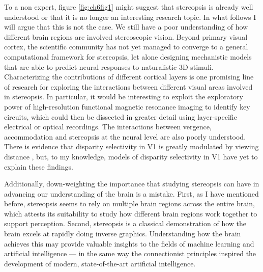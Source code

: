 To a non expert, figure \ref{fig:ch6fig1} might suggest that stereopsis is already well understood or that it is no longer an interesting research topic. In what follows I will argue that this is not the case. We still have a poor understanding of how different brain regions are involved stereoscopic vision. Beyond primary visual cortex, the scientific community has not yet managed to converge to a general computational framework for stereopsis, let alone designing mechanistic models that are able to predict neural responses to naturalistic 3D stimuli. Characterizing the contributions of different cortical layers is one promising line of research for exploring the interactions between different visual areas involved in stereopsis. In particular, it would be interesting to exploit the exploratory power of high-resolution functional magnetic resonance imaging to identify key circuits, which could then be dissected in greater detail using layer-specific electrical or optical recordings. The interactions between vergence, accommodation and stereopsis at the neural level are also poorly understood. There is evidence that disparity selectivity in V1 is greatly modulated by viewing distance \cite{Trotter:1992ij}, but, to my knowledge, models of disparity selectivity in V1 have yet to explain these findings.

Additionally, down-weighting the importance that studying stereopsis can have in advancing our understanding of the brain is a mistake. First, as I have mentioned before, stereopsis seems to rely on multiple brain regions across the entire brain, which attests its suitability to study how different brain regions work together to support perception. Second, stereopsis is a classical demonstration of how the brain excels at rapidly doing inverse graphics. Understanding how the brain achieves this may provide valuable insights to the fields of machine learning and artificial intelligence --- in the same way the connectionist principles inspired the development of modern, state-of-the-art artificial intelligence.




